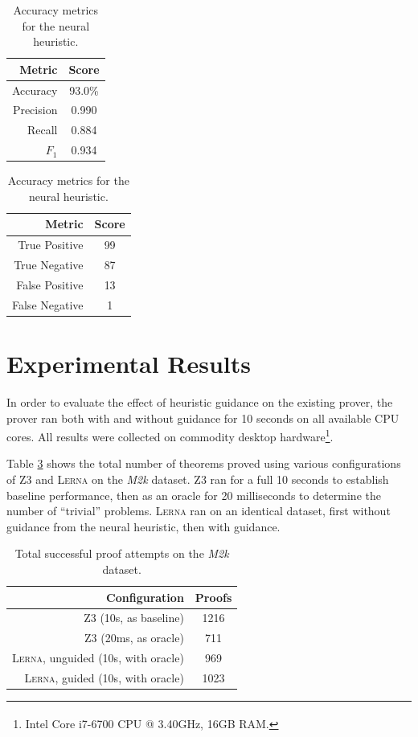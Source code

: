 \documentclass{llncs}
\newcommand{\lerna}{\textsc{Lerna}}
\newcommand{\z}[1]{\textsc{Z3}}
\newcommand{\mizarsmall}{\textit{M2k}}
\begin{document}
\begin{table}[t]
	\caption{Accuracy metrics for the neural heuristic.}
	\centering
	\begin{tabular}{r | c}
		\textbf{Metric} & \textbf{Score}\\
		\hline
		Accuracy & 93.0\%\\
		Precision&0.990\\	
		Recall&0.884\\
		\(F_1\)&0.934\\			
	\end{tabular}
	\quad
	\begin{tabular}{r | c}
		\textbf{Metric} & \textbf{Score}\\
		\hline
		True Positive&99\\
		True Negative&87\\
		False Positive&13\\		
		False Negative&1\\
	\end{tabular}	
	\label{table:network-evaluation}
\end{table}
\section{Experimental Results}
\label{section:results}
In order to evaluate the effect of heuristic guidance on the existing prover, the prover ran both with and without guidance for 10 seconds on all available CPU cores.
All results were collected on commodity desktop hardware\footnote{Intel\textsuperscript{\textregistered} Core\textsuperscript{\texttrademark} i7-6700 CPU @ 3.40GHz, 16GB RAM.}.

Table \ref{table:m2k-results} shows the total number of theorems proved using various configurations of \z3 and \lerna{} on the \mizarsmall{} dataset.
\z3 ran for a full 10 seconds to establish baseline performance, then as an oracle for 20 milliseconds to determine the number of ``trivial'' problems.
\lerna{} ran on an identical dataset, first without guidance from the neural heuristic, then with guidance.

\begin{table}[t]
	\caption{Total successful proof attempts on the \mizarsmall{} dataset.}
	\centering
	\begin{tabular}{r | c}
		\textbf{Configuration} & \textbf{Proofs}\\
		\hline
		\z3 (10s, as baseline) & 1216\\
		\z3 (20ms, as oracle) & 711\\
		\lerna{}, unguided (10s, with oracle) & 969\\
		\lerna{}, guided (10s, with oracle) & 1023\\
	\end{tabular}
	\label{table:m2k-results}
\end{table}
\end{document}
